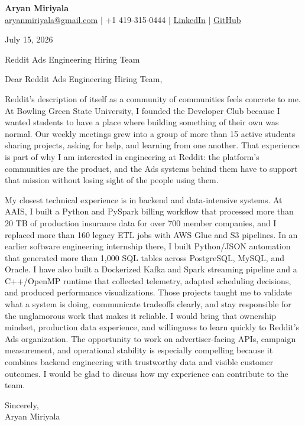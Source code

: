 \documentclass[letterpaper,11pt]{article}
\begin{document}
{\Large\textbf{Aryan Miriyala}}\\
\href{mailto:aryanmiriyala@gmail.com}{aryanmiriyala@gmail.com} $|$ +1 419-315-0444 $|$
\href{https://www.linkedin.com/in/aryan-miriyala-7788a21b6/}{LinkedIn} $|$
\href{https://github.com/aryanmiriyala}{GitHub}

July 15, 2026

Reddit Ads Engineering Hiring Team

Dear Reddit Ads Engineering Hiring Team,

Reddit's description of itself as a community of communities feels concrete to me. At Bowling Green State University, I founded the Developer Club because I wanted students to have a place where building something of their own was normal. Our weekly meetings grew into a group of more than 15 active students sharing projects, asking for help, and learning from one another. That experience is part of why I am interested in engineering at Reddit: the platform's communities are the product, and the Ads systems behind them have to support that mission without losing sight of the people using them.

My closest technical experience is in backend and data-intensive systems. At AAIS, I built a Python and PySpark billing workflow that processed more than 20 TB of production insurance data for over 700 member companies, and I replaced more than 160 legacy ETL jobs with AWS Glue and S3 pipelines. In an earlier software engineering internship there, I built Python/JSON automation that generated more than 1,000 SQL tables across PostgreSQL, MySQL, and Oracle. I have also built a Dockerized Kafka and Spark streaming pipeline and a C++/OpenMP runtime that collected telemetry, adapted scheduling decisions, and produced performance visualizations. Those projects taught me to validate what a system is doing, communicate tradeoffs clearly, and stay responsible for the unglamorous work that makes it reliable. I would bring that ownership mindset, production data experience, and willingness to learn quickly to Reddit's Ads organization. The opportunity to work on advertiser-facing APIs, campaign measurement, and operational stability is especially compelling because it combines backend engineering with trustworthy data and visible customer outcomes. I would be glad to discuss how my experience can contribute to the team.

Sincerely,\\
Aryan Miriyala
\end{document}
